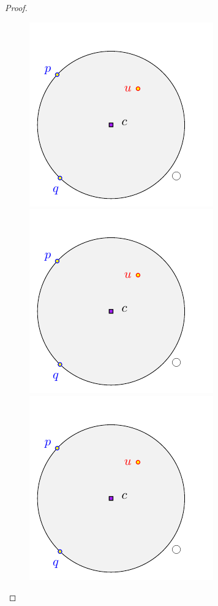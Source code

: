 \documentclass[12pt]{article}%
\begin{document}
\begin{proof}
\begin{compactitem}
        \begin{figure}[h]
            \phantom{}\hfill%
            \includegraphics[page=1]{figs/shrink}%
            \hfill%
            \includegraphics[page=2]{figs/shrink}%
            \hfill%
            \includegraphics[page=3]{figs/shrink}%
            \hfill%
            \phantom{}%

\end{figure}
\end{compactitem}
\end{proof}
\end{document}
